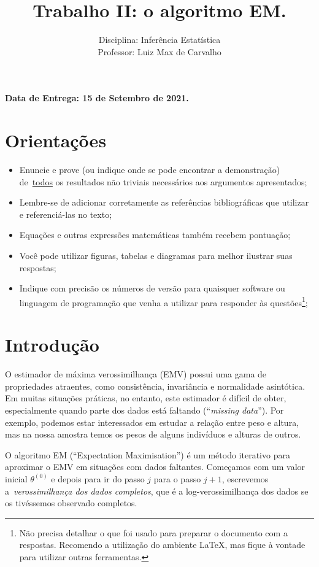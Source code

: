 \documentclass[a4paper,10pt, notitlepage]{report}
\title{Trabalho II: o algoritmo EM.}
\author{Disciplina: Inferência Estatística \\ Professor: Luiz Max de Carvalho}
\begin{document}
\maketitle

\textbf{Data de Entrega: 15 de Setembro de 2021.}

\section*{Orientações}
\begin{itemize}
 \item Enuncie e prove (ou indique onde se pode encontrar a demonstração) de~\underline{todos} os resultados não triviais necessários aos argumentos apresentados;
 \item Lembre-se de adicionar corretamente as referências bibliográficas que utilizar e referenciá-las no texto;
 \item Equações e outras expressões matemáticas também recebem pontuação;
 \item Você pode utilizar figuras, tabelas e diagramas para melhor ilustrar suas respostas;
 \item Indique com precisão os números de versão para quaisquer software ou linguagem de programação que venha a utilizar para responder às questões\footnote{Não precisa detalhar o que foi usado para preparar o documento com a respostas. Recomendo a utilização do ambiente LaTeX, mas fique à vontade para utilizar outras ferramentas.};
 \end{itemize}


\section*{Introdução}

O estimador de máxima verossimilhança (EMV) possui uma gama de propriedades atraentes, como consistência, invariância e normalidade asintótica.
Em muitas situações práticas, no entanto, este estimador é difícil de obter, especialmente quando parte dos dados está faltando (``\textit{missing data}'').
Por exemplo, podemos estar interessados em estudar a relação entre peso e altura, mas na nossa amostra temos os pesos de alguns indivíduos e alturas de outros.

O algoritmo EM (``Expectation Maximisation'') é um método iterativo para aproximar o EMV em situações com dados faltantes.
Começamos com um valor inicial $\theta^{(0)}$ e depois para ir do passo $j$ para o passo $j + 1$, escrevemos a~\textit{verossimilhança dos dados completos}, que é a log-verossimilhança dos dados se os tivéssemos observado completos.
\end{document}

